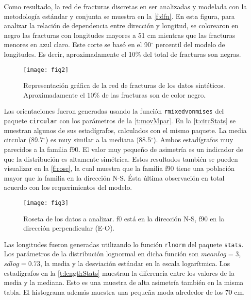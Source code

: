 Como resultado, la red de fracturas discretas en ser analizadas y modelada con la metodolog\'ia est\'andar y conjunta se muestra en la \autoref{f:dfn}. En esta figura, para analizar la relaci\'on de dependencia entre direcci\'on y longitud, se colorearon en negro las fracturas con longitudes mayores a 51 cm mientras que las fracturas menores en azul claro. Este corte se bas\'o en el 90$^\circ$ percentil del modelo de longitudes. Es decir, aproximadamente el 10\% del total de fracturas son negras.

\begin{figure} %
	\centering
	\texttt{[image: fig2]}
	\caption{Representaci\'on gr\'afica de la red de fracturas de los datos sint\'eticos. Aproximadamente el 10\% de las fracturas son de color negro.}
	\label{f:dfn}
\end{figure}

Las orientaciones fueron generadas usando la funci\'on \verb|rmixedvonmises| del paquete \verb|circular| \citep{agostinelli_r_2013} con los par\'ametros de la \autoref{t:movMpar}. En la \autoref{t:circStats} se muestran algunos de sus estad\'igrafos, calculados con el mismo paquete.
La media circular (89.7$^{\circ}$) es muy similar a la mediana
(88.5$^{\circ}$). Ambos estad\'igrafos muy parecidos a la familia f90. El valor muy peque\~no de asimetr\'ia es un indicador de que la distribuci\'on es altamente sim\'etrica. Estos resultados tambi\'en se pueden visualizar en la \autoref{f:rose}, la cual muestra que la familia f90 tiene una poblaci\'on mayor que la familia en la direcci\'on N-S. \'Esta \'ultima observaci\'on en total acuerdo con los requerimientos del modelo.



\begin{figure}[H]
	\centering
	\texttt{[image: fig3]}
	\caption{Roseta de los datos a analizar. f0 est\'a en la direcci\'on N-S, f90 en la direcci\'on perpendicular (E-O).}
	\label{f:rose}
\end{figure}



Las longitudes fueron generadas utilizando lo funci\'on \verb|rlnorm| del paquete \verb|stats|. Los par\'ametros de la distribuci\'on lognormal en dicha funci\'on son $meanlog = 3$, $sdlog= 0.73$, la media y la desviaci\'on est\'andar en la escala logar\'itmica. Los estad\'igrafos en la \autoref{t:lengthStats} muestran la diferencia entre los valores de la media y la mediana. Esto es una muestra de alta asimetr\'ia tambi\'en en la misma tabla. El histograma adem\'as muestra una peque\~na moda alrededor de los 70 cm.

